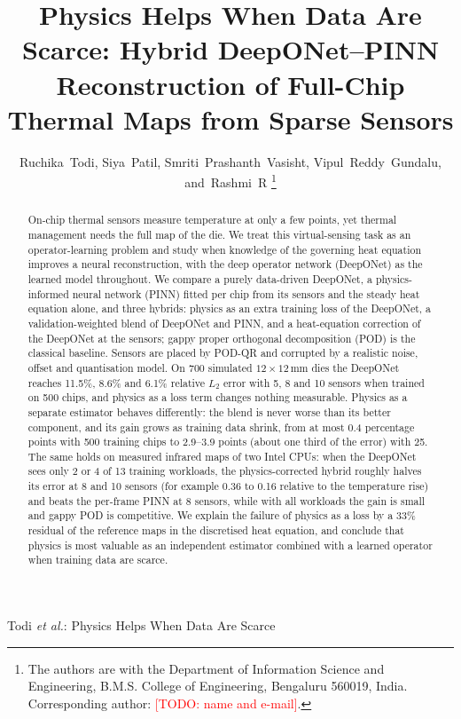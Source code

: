 \documentclass[journal]{IEEEtran}
\newcommand{\todo}[1]{\textcolor{red}{[TODO: #1]}}
\begin{document}
\title{Physics Helps When Data Are Scarce: Hybrid DeepONet--PINN Reconstruction of Full-Chip Thermal Maps from Sparse Sensors}

\author{Ruchika~Todi,
        Siya~Patil,
        Smriti~Prashanth~Vasisht,
        Vipul~Reddy~Gundalu,
        and~Rashmi~R%
\thanks{The authors are with the Department of Information Science and Engineering, B.M.S. College of Engineering, Bengaluru 560019, India.
Corresponding author: \todo{name and e-mail}.}}

%
{Todi \MakeLowercase{\textit{et al.}}: Physics Helps When Data Are Scarce}

\maketitle

\begin{abstract}
On-chip thermal sensors measure temperature at only a few points, yet thermal management needs the full map of the die.
We treat this virtual-sensing task as an operator-learning problem and study when knowledge of the governing heat equation improves a neural reconstruction, with the deep operator network (DeepONet) as the learned model throughout.
We compare a purely data-driven DeepONet, a physics-informed neural network (PINN) fitted per chip from its sensors and the steady heat equation alone, and three hybrids: physics as an extra training loss of the DeepONet, a validation-weighted blend of DeepONet and PINN, and a heat-equation correction of the DeepONet at the sensors; gappy proper orthogonal decomposition (POD) is the classical baseline.
Sensors are placed by POD-QR and corrupted by a realistic noise, offset and quantisation model.
On 700 simulated $12\times12$\,mm dies the DeepONet reaches 11.5\%, 8.6\% and 6.1\% relative $L_2$ error with 5, 8 and 10 sensors when trained on 500 chips, and physics as a loss term changes nothing measurable.
Physics as a separate estimator behaves differently: the blend is never worse than its better component, and its gain grows as training data shrink, from at most 0.4 percentage points with 500 training chips to 2.9--3.9 points (about one third of the error) with 25.
The same holds on measured infrared maps of two Intel CPUs: when the DeepONet sees only 2 or 4 of 13 training workloads, the physics-corrected hybrid roughly halves its error at 8 and 10 sensors (for example 0.36 to 0.16 relative to the temperature rise) and beats the per-frame PINN at 8 sensors, while with all workloads the gain is small and gappy POD is competitive.
We explain the failure of physics as a loss by a 33\% residual of the reference maps in the discretised heat equation, and conclude that physics is most valuable as an independent estimator combined with a learned operator when training data are scarce.
\end{abstract}
\end{document}
